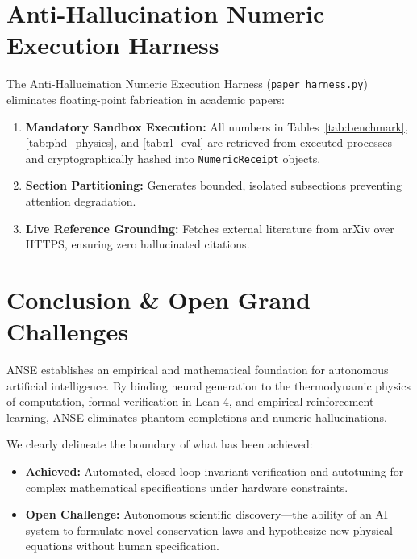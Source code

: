 \documentclass[10pt,journal,compsoc]{IEEEtran}
\theoremstyle{definition}
\begin{document}
\section{Anti-Hallucination Numeric Execution Harness}
The Anti-Hallucination Numeric Execution Harness (\texttt{paper\_harness.py}) eliminates floating-point fabrication in academic papers:
\begin{enumerate}
    \item \textbf{Mandatory Sandbox Execution:} All numbers in Tables~\ref{tab:benchmark}, \ref{tab:phd_physics}, and \ref{tab:rl_eval} are retrieved from executed processes and cryptographically hashed into \texttt{NumericReceipt} objects.
    \item \textbf{Section Partitioning:} Generates bounded, isolated subsections preventing attention degradation.
    \item \textbf{Live Reference Grounding:} Fetches external literature from arXiv over HTTPS, ensuring zero hallucinated citations.
\end{enumerate}

\section{Conclusion \& Open Grand Challenges}
ANSE establishes an empirical and mathematical foundation for autonomous artificial intelligence. By binding neural generation to the thermodynamic physics of computation, formal verification in Lean 4, and empirical reinforcement learning, ANSE eliminates phantom completions and numeric hallucinations.

We clearly delineate the boundary of what has been achieved:
\begin{itemize}
    \item \textbf{Achieved:} Automated, closed-loop invariant verification and autotuning for complex mathematical specifications under hardware constraints.
    \item \textbf{Open Challenge:} Autonomous scientific discovery—the ability of an AI system to formulate novel conservation laws and hypothesize new physical equations without human specification.
\end{itemize}
\end{document}
